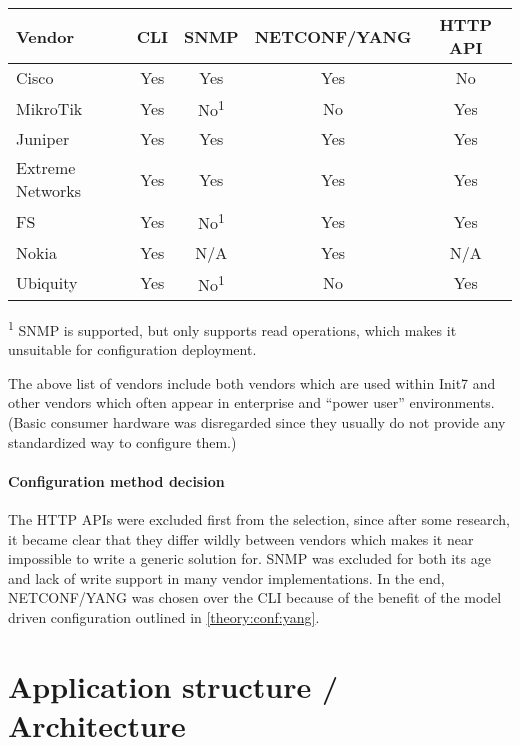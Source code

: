 \begin{center}
\begin{tabular}{l|c|c|c|c}
  Vendor & CLI & SNMP & NETCONF/YANG & HTTP API \\
  \hline\hline
  Cisco & Yes & Yes & Yes & No \\
  \hline
  MikroTik & Yes & No\textsuperscript{1} & No & Yes \\
  \hline
  Juniper & Yes & Yes & Yes & Yes \\
  \hline
  Extreme Networks & Yes & Yes & Yes & Yes \\
  \hline
  FS & Yes & No\textsuperscript{1} & Yes & Yes \\
  \hline
  Nokia & Yes & N/A & Yes & N/A \\
  \hline
  Ubiquity & Yes & No\textsuperscript{1} & No & Yes \\
\end{tabular}
\end{center}

\textsuperscript{1} SNMP is supported, but only supports read
operations, which makes it unsuitable for configuration deployment.

The above list of vendors include both vendors which are used within Init7
and other vendors which often appear in enterprise and ``power user''
environments. (Basic consumer hardware was disregarded since they usually
do not provide any standardized way to configure them.)

\paragraph{Configuration method decision} The HTTP APIs were excluded first
from the selection, since after some research, it became clear that they
differ wildly between vendors which makes it near impossible to write
a generic solution for. SNMP was excluded for both its age and lack
of write support in many vendor implementations. In the end, NETCONF/YANG was
chosen over the CLI because of the benefit of the model driven configuration
outlined in \ref{theory:conf:yang}.

\section{Application structure / Architecture}


